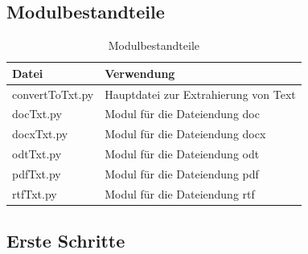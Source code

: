 \documentclass[12pt]{scrartcl}
\begin{document}
\subsection{Modulbestandteile}
\label{sec:modulbestandteile}
\begin{table}[H]
\centering
\label{modulbestandteil}
\begin{tabular}{|l|l|}
\hline
\rowcolor[HTML]{9B9B9B} 
Datei           & Verwendung                           \\ \hline
convertToTxt.py & Hauptdatei zur Extrahierung von Text \\ \hline
docTxt.py       & Modul für die Dateiendung doc        \\ \hline
docxTxt.py      & Modul für die Dateiendung docx       \\ \hline
odtTxt.py       & Modul für die Dateiendung odt        \\ \hline
pdfTxt.py       & Modul für die Dateiendung pdf        \\ \hline
rtfTxt.py       & Modul für die Dateiendung rtf        \\ \hline
\end{tabular}
\caption{Modulbestandteile}
\end{table}
\newpage
\subsection{Erste Schritte}
\label{sec:first-steps}
\end{document}
